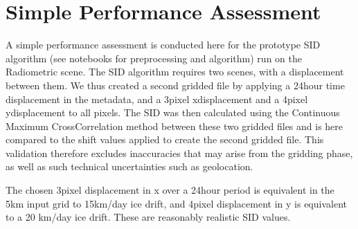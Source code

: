 \documentclass[letterpaper,10pt,english]{jupyterBook}
\begin{document}
\section{Simple Performance Assessment}
\label{\detokenize{CIMR_L2_Sea_Ice_Drift_performanceAssessment:simple-performance-assessment}}
\sphinxAtStartPar
A simple performance assessment is conducted here for the prototype SID algorithm (see notebooks for pre\sphinxhyphen{}processing and algorithm) run on the Radiometric scene. The SID algorithm requires two scenes, with a displacement between them. We thus created a second gridded file by applying a 24\sphinxhyphen{}hour time displacement in the metadata, and a 3\sphinxhyphen{}pixel x\sphinxhyphen{}displacement and a 4\sphinxhyphen{}pixel y\sphinxhyphen{}displacement to all pixels. The SID was then calculated using the Continuous Maximum Cross\sphinxhyphen{}Correlation method between these two gridded files and is here compared to the shift values applied to create the second gridded file. This validation therefore excludes inaccuracies that may arise from the gridding phase, as well as such technical uncertainties such as geolocation.

\sphinxAtStartPar
The chosen 3\sphinxhyphen{}pixel displacement in x over a 24\sphinxhyphen{}hour period is equivalent in the 5km input grid to 15km/day ice drift, and 4\sphinxhyphen{}pixel displacement in y is equivalent to a 20 km/day ice drift. These are reasonably realistic SID values.
\end{document}
